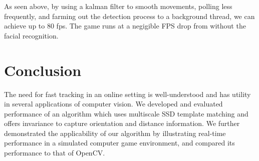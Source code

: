 \documentclass[10pt,twocolumn,letterpaper]{article}
\begin{document}
As seen above, by using a kalman filter to smooth movements, polling less frequently, and farming out the detection process to a background thread, we can achieve up to 80 fps. The game runs at a negigible FPS drop from without the facial recognition.

\section{Conclusion}
The need for fast tracking in an online setting is well-understood and has utility
in several applications of computer vision. We developed and evaluated performance
of an algorithm which uses multiscale SSD template matching and offers invariance to
capture orientation and distance information. We further demonstrated the applicability of our
algorithm by illustrating real-time performance in a simulated computer game environment,
and compared its performance to that of OpenCV.

{\small


}
\end{document}
